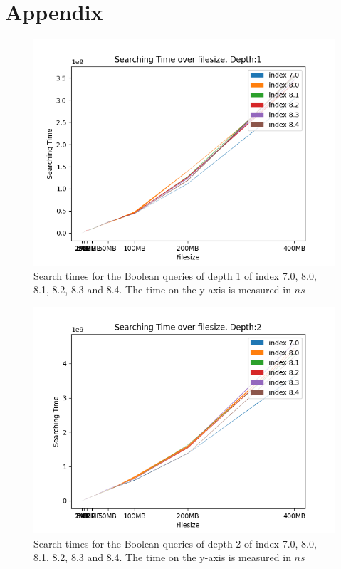 \chapter{Appendix}
\begin{figure}[H]
    \centering
    \includegraphics[width=.8\textwidth]{LaTeX/Pictures/Results/BooleanSearchDepth0.png}
    \caption{Search times for the Boolean queries of depth 1 of index 7.0, 8.0, 8.1, 8.2, 8.3 and 8.4. The time on the y-axis is measured in $ns$}
    \label{fig:BPindextime23450}
\end{figure}

\begin{figure}[H]
    \centering
    \includegraphics[width=.8\textwidth]{LaTeX/Pictures/Results/BooleanSearchDepth1.png}
    \caption{Search times for the Boolean queries of depth 2 of index 7.0, 8.0, 8.1, 8.2, 8.3 and 8.4. The time on the y-axis is measured in $ns$}
    \label{fig:BPindextime23451}
\end{figure}

